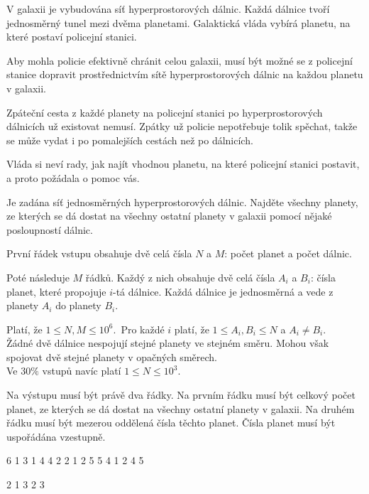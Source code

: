 





V galaxii je vybudována síť hyperprostorových dálnic. Každá dálnice tvoří
jednosměrný tunel mezi dvěma planetami. Galaktická vláda vybírá planetu, na
které postaví policejní stanici.

Aby mohla policie efektivně chránit celou galaxii, musí být možné se z policejní
stanice dopravit prostřednictvím sítě hyperprostorových dálnic na každou planetu
v galaxii.

Zpáteční cesta z každé planety na policejní stanici po hyperprostorových
dálnicích už existovat nemusí. Zpátky už policie nepotřebuje tolik spěchat,
takže se může vydat i po pomalejších cestách než po dálnicích.

Vláda si neví rady, jak najít vhodnou planetu, na které policejní stanici
postavit, a proto požádala o pomoc vás.


Je zadána síť jednosměrných hyperprostorových dálnic. Najděte všechny planety,
ze kterých se dá dostat na všechny ostatní planety v galaxii pomocí nějaké
posloupností dálnic.


První řádek vstupu obsahuje dvě celá čísla $N$ a $M$: počet planet a počet
dálnic.

Poté následuje $M$ řádků. Každý z nich obsahuje dvě celá čísla $A_i$ a $B_i$:
čísla planet, které propojuje $i$-tá dálnice. Každá dálnice je jednosměrná a
vede z planety $A_i$ do planety $B_i$.

\bigskip
\noindent
Platí, že $1 \leq N, M \leq 10^6$.\
Pro každé $i$ platí, že $1 \leq A_i, B_i \leq N$ a $A_i \neq B_i$.\\
Žádné dvě dálnice nespojují stejné planety ve stejném směru. Mohou však spojovat
  dvě stejné planety v opačných směrech.\\
Ve $30\%$ vstupů navíc platí $1 \leq N \leq 10^3$.


Na výstupu musí být právě dva řádky. Na prvním řádku musí být celkový počet
planet, ze kterých se dá dostat na všechny ostatní planety v galaxii. Na druhém
řádku musí být mezerou oddělená čísla těchto planet. Čísla planet musí být
uspořádána vzestupně.


 6
1 3
1 4
4 2
2 1
2 5
5 4
1 2 4 5
\sampleEND

 2
1 3
2 3
~
\sampleEND


